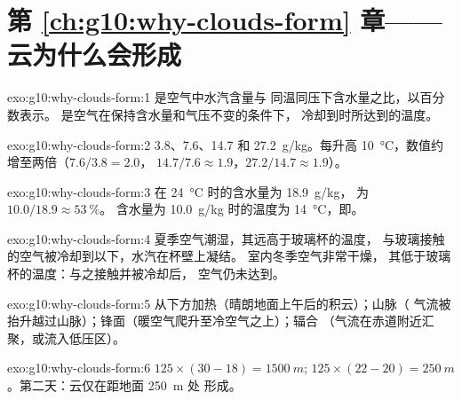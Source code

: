 \section*{第 \ref{ch:g10:why-clouds-form} 章——云为什么会形成}

\begin{solution}{exo:g10:why-clouds-form:1}
是空气中水汽含量与
同温同压下含水量之比，以百分数表示。
是空气在保持含水量和气压不变的条件下，
冷却到时所达到的温度。
\end{solution}

\begin{solution}{exo:g10:why-clouds-form:2}
\num{3.8}、\num{7.6}、\num{14.7} 和 \qty{27.2}{g/kg}。每升高
\qty{10}{\degreeCelsius}，数值约增至两倍（$7.6/3.8 = 2.0$，
$14.7/7.6 \approx 1.9$，$27.2/14.7 \approx 1.9$）。
\end{solution}

\begin{solution}{exo:g10:why-clouds-form:3}
在 \qty{24}{\degreeCelsius} 时的含水量为 \qty{18.9}{g/kg}，
为 $10.0/18.9 \approx \qty{53}{\percent}$。
含水量为 \qty{10.0}{g/kg} 时的温度为 \qty{14}{\degreeCelsius}，即。
\end{solution}

\begin{solution}{exo:g10:why-clouds-form:4}
夏季空气潮湿，其远高于玻璃杯的温度，
与玻璃接触的空气被冷却到以下，水汽在杯壁上凝结。
室内冬季空气非常干燥，
其低于玻璃杯的温度：与之接触并被冷却后，
空气仍未达到。
\end{solution}

\begin{solution}{exo:g10:why-clouds-form:5}
从下方加热（晴朗地面上午后的积云）；山脉（
气流被抬升越过山脉）；锋面（暖空气爬升至冷空气之上）；辐合
（气流在赤道附近汇聚，或流入低压区）。
\end{solution}

\begin{solution}{exo:g10:why-clouds-form:6}
$125 \times (30 - 18) = \qty{1500}{m}$; $125 \times (22 - 20) =
\qty{250}{m}$。第二天：云仅在距地面 \qty{250}{m} 处
形成。
\end{solution}

